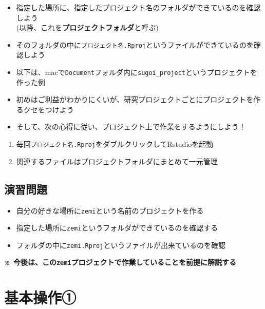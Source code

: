 \documentclass[
]{book}
\providecommand{\tightlist}{%
  \setlength{\itemsep}{0pt}\setlength{\parskip}{0pt}}
\begin{document}
\begin{itemize}
\tightlist
\item
  指定した場所に、指定したプロジェクト名のフォルダができているのを確認しよう\\
  (以降、これを\textbf{プロジェクトフォルダ}と呼ぶ)
\item
  そのフォルダの中に\texttt{プロジェクト名.Rproj}というファイルができているのを確認しよう
\item
  以下は、macで\texttt{Document}フォルダ内に\texttt{sugoi\_project}というプロジェクトを作った例
\end{itemize}

\begin{itemize}
\tightlist
\item
  初めはご利益がわかりにくいが、研究プロジェクトごとにプロジェクトを作るクセをつけよう
\item
  そして、次の心得に従い、プロジェクト上で作業をするようにしよう！
\end{itemize}

\begin{enumerate}
\def\labelenumi{\arabic{enumi}.}
\tightlist
\item
  毎回\texttt{プロジェクト名.Rproj}をダブルクリックしてRstudioを起動
\item
  関連するファイルはプロジェクトフォルダにまとめて一元管理
\end{enumerate}

\hypertarget{ux6f14ux7fd2ux554fux984c}{%
\section{演習問題}\label{ux6f14ux7fd2ux554fux984c}}

\begin{itemize}
\tightlist
\item
  自分の好きな場所に\texttt{zemi}という名前のプロジェクトを作る
\item
  指定した場所に\texttt{zemi}というフォルダができているのを確認する
\item
  フォルダの中に\texttt{zemi.Rproj}というファイルが出来ているのを確認
\end{itemize}

\textbf{※ 今後は、この\texttt{zemi}プロジェクトで作業していることを前提に解説する}

\hypertarget{ux57faux672cux64cdux4f5cux2460}{%
\chapter{基本操作①}\label{ux57faux672cux64cdux4f5cux2460}}
\end{document}
